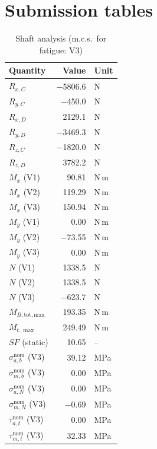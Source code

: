\documentclass[11pt,a4paper]{article}
\begin{document}
\section{Submission tables}
\begin{table}[H]\centering\small
\begin{minipage}[t]{0.48\textwidth}\centering
\caption*{Shaft analysis (m.c.s.\ for fatigue: V3)}
\begin{tabular}{lrl}
\toprule
Quantity & Value & Unit \\
\midrule
$R_{x,C}$ & \ensuremath{-}5806.6 & N \\
$R_{y,C}$ & \ensuremath{-}450.0 & N \\
$R_{x,D}$ & 2129.1 & N \\
$R_{y,D}$ & \ensuremath{-}3469.3 & N \\
$R_{z,C}$ & \ensuremath{-}1820.0 & N \\
$R_{z,D}$ & 3782.2 & N \\
\midrule
$M_x$ (V1) & 90.81 & N\,m \\
$M_x$ (V2) & 119.29 & N\,m \\
$M_x$ (V3) & 150.94 & N\,m \\
$M_y$ (V1) & 0.00 & N\,m \\
$M_y$ (V2) & \ensuremath{-}73.55 & N\,m \\
$M_y$ (V3) & 0.00 & N\,m \\
$N$ (V1) & 1338.5 & N \\
$N$ (V2) & 1338.5 & N \\
$N$ (V3) & \ensuremath{-}623.7 & N \\
$M_{B,\mathrm{tot,max}}$ & 193.35 & N\,m \\
$M_{t,\max}$ & 249.49 & N\,m \\
$SF$ (static) & 10.65 & -- \\
\midrule
$\sigma_{a,b}^{\mathrm{nom}}$ (V3) & 39.12 & MPa \\
$\sigma_{m,b}^{\mathrm{nom}}$ (V3) & 0.00 & MPa \\
$\sigma_{a,N}^{\mathrm{nom}}$ (V3) & 0.00 & MPa \\
$\sigma_{m,N}^{\mathrm{nom}}$ (V3) & \ensuremath{-}0.69 & MPa \\
$\tau_{a,t}^{\mathrm{nom}}$ (V3) & 0.00 & MPa \\
$\tau_{m,t}^{\mathrm{nom}}$ (V3) & 32.33 & MPa \\

\end{tabular}
\end{minipage}
\end{table}
\end{document}
